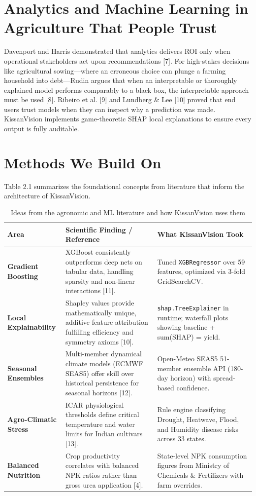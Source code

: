 \documentclass[11pt,a4paper]{report}
\begin{document}
\section{Analytics and Machine Learning in Agriculture That People Trust}
Davenport and Harris demonstrated that analytics delivers ROI only when operational stakeholders act upon recommendations [7]. For high-stakes decisions like agricultural sowing---where an erroneous choice can plunge a farming household into debt---Rudin argues that when an interpretable or thoroughly explained model performs comparably to a black box, the interpretable approach must be used [8]. Ribeiro et al. [9] and Lundberg \& Lee [10] proved that end users trust models when they can inspect why a prediction was made. KissanVision implements game-theoretic SHAP local explanations to ensure every output is fully auditable.

\section{Methods We Build On}
Table 2.1 summarizes the foundational concepts from literature that inform the architecture of KissanVision.

\begin{table}[htbp]
\centering
\small
\caption{Ideas from the agronomic and ML literature and how KissanVision uses them}
\begin{tabularx}{\textwidth}{lXX}
\toprule
\textbf{Area} & \textbf{Scientific Finding / Reference} & \textbf{What KissanVision Took} \\
\midrule
\textbf{Gradient Boosting} & XGBoost consistently outperforms deep nets on tabular data, handling sparsity and non-linear interactions [11]. & Tuned \texttt{XGBRegressor} over 59 features, optimized via 3-fold GridSearchCV. \\
\addlinespace
\textbf{Local Explainability} & Shapley values provide mathematically unique, additive feature attribution fulfilling efficiency and symmetry axioms [10]. & \texttt{shap.TreeExplainer} in runtime; waterfall plots showing baseline + sum(SHAP) = yield. \\
\addlinespace
\textbf{Seasonal Ensembles} & Multi-member dynamical climate models (ECMWF SEAS5) offer skill over historical persistence for seasonal horizons [12]. & Open-Meteo SEAS5 51-member ensemble API (180-day horizon) with spread-based confidence. \\
\addlinespace
\textbf{Agro-Climatic Stress} & ICAR physiological thresholds define critical temperature and water limits for Indian cultivars [13]. & Rule engine classifying Drought, Heatwave, Flood, and Humidity disease risks across 33 states. \\
\addlinespace
\textbf{Balanced Nutrition} & Crop productivity correlates with balanced NPK ratios rather than gross urea application [4]. & State-level NPK consumption figures from Ministry of Chemicals \& Fertilizers with farm overrides. \\
\bottomrule
\end{tabularx}
\end{table}
\end{document}
